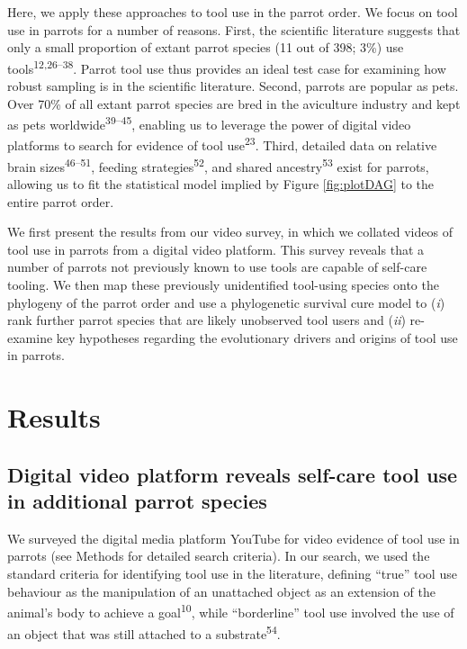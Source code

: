 \documentclass[
  man, donotrepeattitle,floatsintext]{apa6}
\begin{document}
Here, we apply these approaches to tool use in the parrot order. We focus on
tool use in parrots for a number of reasons. First, the scientific literature
suggests that only a small proportion of extant parrot species (11 out of 398;
3\%) use tools\textsuperscript{12,26--38}. Parrot tool
use thus provides an ideal test case for examining how robust sampling is in the
scientific literature. Second, parrots are popular as pets. Over 70\% of all
extant parrot species are bred in the aviculture industry and kept as pets
worldwide\textsuperscript{39--45}, enabling us to leverage the power of digital video platforms to
search for evidence of tool use\textsuperscript{23}. Third, detailed data on relative
brain sizes\textsuperscript{46--51}, feeding strategies\textsuperscript{52}, and shared ancestry\textsuperscript{53} exist for parrots, allowing us to fit the statistical model implied
by Figure \ref{fig:plotDAG} to the entire parrot order.

We first present the results from our video survey, in which we collated videos
of tool use in parrots from a digital video platform. This survey reveals that a
number of parrots not previously known to use tools are capable of self-care
tooling. We then map these previously unidentified tool-using species onto the
phylogeny of the parrot order and use a phylogenetic survival cure model to
(\emph{i}) rank further parrot species that are likely unobserved tool users and
(\emph{ii}) re-examine key hypotheses regarding the evolutionary drivers and origins
of tool use in parrots.

\hypertarget{results}{%
\section{Results}\label{results}}

\hypertarget{digital-video-platform-reveals-self-care-tool-use-in-additional-parrot-species}{%
\subsection{Digital video platform reveals self-care tool use in additional parrot species}\label{digital-video-platform-reveals-self-care-tool-use-in-additional-parrot-species}}

We surveyed the digital media platform YouTube for video evidence of tool use in
parrots (see Methods for detailed search criteria). In our search, we used the
standard criteria for identifying tool use in the literature, defining ``true''
tool use behaviour as the manipulation of an unattached object as an extension
of the animal's body to achieve a goal\textsuperscript{10}, while ``borderline'' tool
use involved the use of an object that was still attached to a substrate\textsuperscript{54}.
\end{document}
